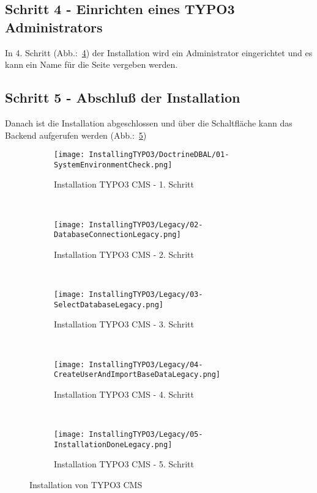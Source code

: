 \subsection{Schritt 4 - Einrichten eines TYPO3 Administrators}
	In 4. Schritt (Abb.:~\ref{fig:installTYPO3LegacyStepFour}) der Installation wird ein Administrator eingerichtet und es kann ein Name für die Seite vergeben werden.

\subsection{Schritt 5 - Abschluß der Installation}
	Danach ist die Installation abgeschlossen und über die Schaltfläche kann das Backend aufgerufen werden (Abb.:~\ref{fig:installTYPO3LegacyStepFive})

	\begin{figure}[H]
		\begin{subfigure}[b]{0.5\textwidth}
			\texttt{[image: InstallingTYPO3/DoctrineDBAL/01-SystemEnvironmentCheck.png]}
			\caption{Installation TYPO3 CMS - 1. Schritt}
			\label{fig:installTYPO3LegacyStepOne}
		\end{subfigure}%
		~ %
		\begin{subfigure}[b]{0.5\textwidth}
			\texttt{[image: InstallingTYPO3/Legacy/02-DatabaseConnectionLegacy.png]}
			\caption{Installation TYPO3 CMS - 2. Schritt}
			\label{fig:installTYPO3LegacyStepTwo}
		\end{subfigure}
		~ %
		\begin{subfigure}[b]{0.5\textwidth}
			\texttt{[image: InstallingTYPO3/Legacy/03-SelectDatabaseLegacy.png]}
			\caption{Installation TYPO3 CMS - 3. Schritt}
			\label{fig:installTYPO3LegacyStepThree}
		\end{subfigure}%
		~ %
		\begin{subfigure}[b]{0.5\textwidth}
			\texttt{[image: InstallingTYPO3/Legacy/04-CreateUserAndImportBaseDataLegacy.png]}
			\caption{Installation TYPO3 CMS - 4. Schritt}
			\label{fig:installTYPO3LegacyStepFour}
		\end{subfigure}
		~ %
		\begin{subfigure}[b]{0.5\textwidth}
			\texttt{[image: InstallingTYPO3/Legacy/05-InstallationDoneLegacy.png]}
			\caption{Installation TYPO3 CMS - 5. Schritt}
			\label{fig:installTYPO3LegacyStepFive}
		\end{subfigure}%
		\caption{Installation von TYPO3 CMS}
		\label{fig:installationOfTYPO3}
	\end{figure}

